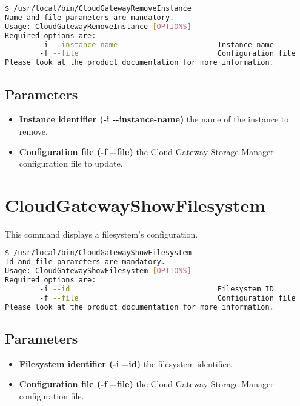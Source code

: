 \documentclass[11pt,fleqn,openany]{book} %
\begin{document}
\begin{lstlisting}[language=bash]
$ /usr/local/bin/CloudGatewayRemoveInstance
Name and file parameters are mandatory.
Usage: CloudGatewayRemoveInstance [OPTIONS]
Required options are:
        -i --instance-name                       Instance name
        -f --file                                Configuration file
Please look at the product documentation for more information.
\end{lstlisting}

\subsection*{Parameters}

\begin{itemize}
\item \textbf{Instance identifier (-i -{}-instance-name)} the name of the instance to remove.

\item \textbf{Configuration file (-f -{}-file)} the Cloud Gateway Storage Manager configuration file to update.

\end{itemize}

\clearpage

\section*{CloudGatewayShowFilesystem}
\label{sec:cloudgatewayshowfilesystem}

This command displays a filesystem's configuration.

\begin{lstlisting}[language=bash]
$ /usr/local/bin/CloudGatewayShowFilesystem
Id and file parameters are mandatory.
Usage: CloudGatewayShowFilesystem [OPTIONS]
Required options are:
        -i --id                                  Filesystem ID
        -f --file                                Configuration file
Please look at the product documentation for more information.
\end{lstlisting}

\subsection*{Parameters}

\begin{itemize}
\item \textbf{Filesystem identifier (-i -{}-id)} the filesystem identifier.

\item \textbf{Configuration file (-f -{}-file)} the Cloud Gateway Storage Manager configuration file.

\end{itemize}
\end{document}
